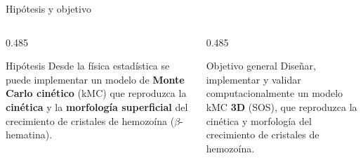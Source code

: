 \documentclass[aspectratio=169,11pt]{beamer}
\begin{document}
\begin{frame}{Hipótesis y objetivo}
  \begin{columns}[T,onlytextwidth]
    \begin{column}{0.485\textwidth}
      \begin{block}{Hipótesis}
        \small Desde la física estadística se puede implementar un modelo de
        \textbf{Monte Carlo cinético} (kMC) que reproduzca la \textbf{cinética} y la
        \textbf{morfología superficial} del crecimiento de cristales de hemozoína
        ($\beta$-hematina).
      \end{block}
    \end{column}
    \begin{column}{0.485\textwidth}
      \begin{block}{Objetivo general}
        \small Diseñar, implementar y validar computacionalmente un modelo kMC
        \textbf{3D} (SOS), que reproduzca la cinética y morfología
        del crecimiento de cristales de hemozoína.
      \end{block}
    \end{column}
  \end{columns}
  \vspace{1.2em}
  \centering
\end{frame}
\end{document}
